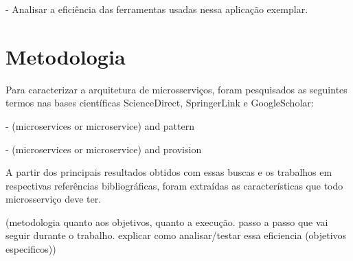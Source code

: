 - Analisar a eficiência das ferramentas usadas nessa aplicação exemplar.

\section{Metodologia}

Para caracterizar a arquitetura de microsserviços, foram pesquisados as seguintes termos nas bases científicas ScienceDirect, SpringerLink e GoogleScholar:

- (microservices or microservice) and pattern

- (microservices or microservice) and provision

A partir dos principais resultados obtidos com essas buscas e os trabalhos em respectivas referências bibliográficas, foram extraídas as características que todo microsserviço deve ter.

(metodologia quanto aos objetivos, quanto a execução. passo a passo que vai seguir durante o trabalho. explicar como analisar/testar essa eficiencia (objetivos especificos))
